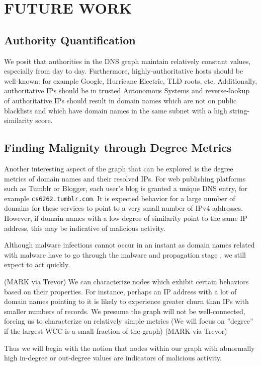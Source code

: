 \documentclass{acm_proc_article-sp}
\begin{document}
\section{FUTURE WORK}


\subsection{Authority Quantification}
We posit that authorities in the DNS graph maintain relatively constant values, especially from day to day. Furthermore, highly-authoritative hosts should be well-known: for example Google, Hurricane Electric, TLD roots, etc. Additionally, authoritative IPs should be in trusted Autonomous Systems and reverse-lookup of authoritative IPs should result in domain names which are not on public blacklists and which have domain names in the same subnet with a high string-similarity score.

\subsection{Finding Malignity through Degree Metrics}
Another interesting aspect of the graph that can be explored is the degree metrics of domain names and their resolved IPs. For web publishing platforms such as Tumblr or Blogger, each user's blog is granted a unique DNS entry, for example \texttt{cs6262.tumblr.com}. It is expected behavior for a large number of domains for these services to point to a very small number of IPv4 addresses. However, if domain names with a low degree of similarity point to the same IP address, this may be indicative of malicious activity.

Although malware infections cannot occur in an instant as domain names related with malware have to go through the malware and propagation stage \cite{Manos2012Auth}, we still expect to act quickly.

(MARK via Trevor)
We can characterize nodes which exhibit certain behaviors based on their properties. For instance, perhaps an IP address with a lot of domain names pointing to it is likely to experience greater churn than IPs with smaller numbers of records. We presume the graph will not be well-connected, forcing us to characterize on relatively simple metrics (We will focus on ''degree'' if the largest WCC is a small fraction of the graph)
(MARK via Trevor)

Thus we will begin with the notion that nodes within our graph with abnormally high in-degree or out-degree values are indicators of malicious activity.
\end{document}
